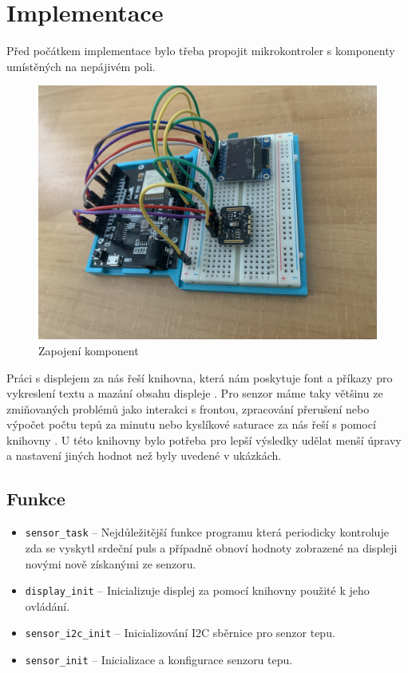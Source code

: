 \section{Implementace}
Před počátkem implementace bylo třeba propojit mikrokontroler s komponenty umístěných na nepájivém poli.
\begin{figure}[h]
    \centering
    \medskip
    \includegraphics[scale=0.05]{fig/IMG_3925.jpeg}
    \medskip
    \caption{Zapojení komponent}
    \label{fig:obr1}
\end{figure}

Práci s displejem za nás řeší knihovna, která nám poskytuje font a příkazy pro vykreslení textu a mazání obsahu displeje \cite{ssd1306-lib}. Pro senzor máme taky většinu ze zmiňovaných problémů jako interakci s frontou, zpracování přerušení nebo výpočet počtu tepů za minutu nebo kyslíkové saturace za nás řeší s pomocí knihovny \cite{max30102-eps-idf-lib}. U této knihovny bylo potřeba pro lepší výsledky udělat menší úpravy a nastavení jiných hodnot než byly uvedené v ukázkách.

\subsection{Funkce}
\begin{itemize}[itemsep=0pt]
    \item \texttt{sensor\_task} -- Nejdůležitější funkce programu která periodicky kontroluje zda se vyskytl srdeční puls a případně obnoví hodnoty zobrazené na displeji novými nově získanými ze senzoru.
    \item \texttt{display\_init} -- Inicializuje displej za pomocí knihovny použité k jeho ovládání.
    \item \texttt{sensor\_i2c\_init} -- Inicializování I2C sběrnice pro senzor tepu.
    \item \texttt{sensor\_init} -- Inicializace a konfigurace senzoru tepu.
\end{itemize}


